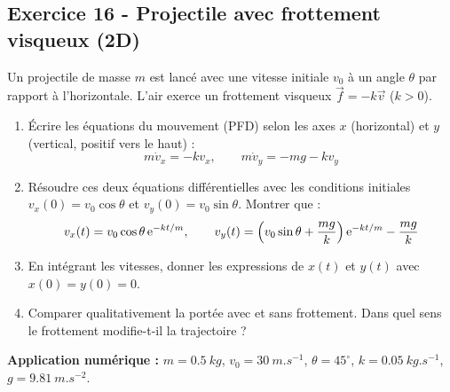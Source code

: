 \documentclass[12pt,a4paper]{article}
\begin{document}
\subsection*{Exercice 16 - Projectile avec frottement visqueux (2D) \niveau{\moyen}}

\begin{boiteexercice}
Un projectile de masse $m$ est lancé avec une vitesse initiale $v_0$ à un angle $\theta$ par rapport à l'horizontale. L'air exerce un frottement visqueux $\vec{f} = -k\vec{v}$ ($k > 0$).

\begin{enumerate}
  \item Écrire les équations du mouvement (PFD) selon les axes $x$ (horizontal) et $y$ (vertical, positif vers le haut) :
  \[
  m\dot{v}_x = -kv_x, \qquad m\dot{v}_y = -mg - kv_y
  \]
  \item Résoudre ces deux équations différentielles avec les conditions initiales $v_x(0) = v_0\cos\theta$ et $v_y(0) = v_0\sin\theta$. Montrer que :
  \[
  v_x(t) = v_0\cos\theta\,\mathrm{e}^{-kt/m}, \qquad v_y(t) = \left(v_0\sin\theta + \frac{mg}{k}\right)\mathrm{e}^{-kt/m} - \frac{mg}{k}
  \]
  \item En intégrant les vitesses, donner les expressions de $x(t)$ et $y(t)$ avec $x(0) = y(0) = 0$.
  \item Comparer qualitativement la portée avec et sans frottement. Dans quel sens le frottement modifie-t-il la trajectoire ?
\end{enumerate}

\textbf{Application numérique :} $m = \qty{0.5}{kg}$, $v_0 = \qty{30}{m.s^{-1}}$, $\theta = 45^\circ $, $k = \qty{0.05}{kg.s^{-1}}$, $g = \qty{9.81}{m.s^{-2}}$.
\end{boiteexercice}
\end{document}
